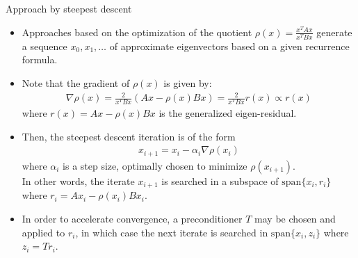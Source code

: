 \documentclass[t,usepdftitle=false]{beamer}
\begin{document}
\begin{frame}{Approach by steepest descent}
\begin{itemize}
\item Approaches based on the optimization of the quotient $\rho(x)=\frac{x^TAx}{x^TBx}$ generate a sequence $x_0,x_1,\dots$ of approximate eigenvectors based on a given recurrence formula.
\item Note that the gradient of $\rho(x)$ is given by:
\begin{align*}
\nabla\rho(x) = \frac{2}{x^TBx}(Ax - \rho(x)Bx) = \frac{2}{x^TBx}r(x)\propto r(x)
\end{align*}
where $r(x) = Ax - \rho(x)Bx$ is the generalized eigen-residual.
\item Then, the steepest descent iteration is of the form
\begin{align*}
x_{i+1} = x_i - \alpha_i \nabla\rho(x_i)
\end{align*}
where $\alpha_i$ is a step size, optimally chosen to minimize $\rho(x_{i+1})$.\vspace{.07cm}\\
In other words, the iterate $x_{i+1}$ is searched in a subspace of $\mathrm{span}\{x_i,r_i\}$ where $r_i=Ax_i-\rho(x_i)Bx_i$.
\item In order to accelerate convergence, a preconditioner $T$ may be chosen and applied to $r_i$, in which case the next iterate is searched in $\mathrm{span}\{x_i,z_i\}$ where $z_i=Tr_i$.
\end{itemize}
\end{frame}
			
\end{document}
